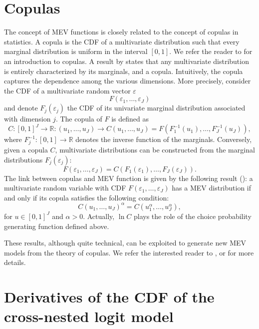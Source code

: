 \documentclass[12pt,a4paper]{article}
\newcommand{\R}{\mathbb{R}}
\begin{document}
\section{Copulas}
\label{sec:copulas}


The concept of MEV functions is closely related to the concept of copulas
in statistics.  A copula is the CDF of a multivariate distribution such that
every marginal distribution is uniform in the interval $[0,1]$.  We
refer the reader to  for an introduction to
copulas. A result by  states that any multivariate distribution is entirely characterized by its marginals, and a copula. Intuitively, the copula captures the dependence among the various dimensions. More precisely, consider the CDF of a multivariate random vector $\varepsilon$
\[
F(\varepsilon_1,\ldots,\varepsilon_J)
\]
and denote $F_j(\varepsilon_j)$ the CDF of its univariate marginal distribution associated with dimension $j$. The copula of $F$ is defined as
\[
C: [0,1]^J \to \R : (u_1,\ldots,u_J) \to C(u_1,\ldots,u_J) = F\left(F_1^{-1}(u_1),\ldots, F_J^{-1}(u_J)\right),
\]
where $F_j^{-1}:[0,1]\to\R$ denotes the inverse function of the marginals.
Conversely, given a copula $C$, multivariate distributions can be constructed from the marginal distributions $F_j(\varepsilon_j)$:
\[
F(\varepsilon_1,\ldots,\varepsilon_J) = C\left(F_1(\varepsilon_1),\ldots,F_J(\varepsilon_J)\right).
\]
The link between copulas and MEV function is given by the following
result (\cite{Joe1997}): a multivariate random variable with CDF
$F(\varepsilon_1,\ldots,\varepsilon_J)$ has a MEV distribution if and
only if its copula satisfies the following condition:
\[
C(u_1,\ldots,u_J)^\alpha = C(u_1^\alpha,\ldots, u_J^\alpha),
\] 
for $u \in [0,1]^J$ and $\alpha > 0$. Actually, $\ln C$ plays the role of the choice
probability generating function defined above.


These results, although quite technical, can be exploited to generate
new MEV models from the theory of copulas. We refer the interested
reader to ,  or
 for more details.

\section{Derivatives of the CDF of the cross-nested logit model}
\end{document}
